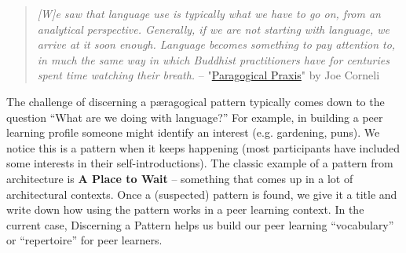 \begin{quote}
\emph{{[}W{]}e saw that language use is typically what we have to go on,
from an analytical perspective. Generally, if we are not starting with
language, we arrive at it soon enough. Language becomes something to pay
attention to, in much the same way in which Buddhist practitioners have
for centuries spent time watching their breath.} --
"\href{http://paragogy.net/ParagogicalPraxisPaper}{Paragogical Praxis}"
by Joe Corneli
\end{quote}

The challenge of discerning a pæragogical pattern typically comes down
to the question ``What are we doing with language?'' For example, in
building a peer learning profile someone might identify an interest
(e.g. gardening, puns). We notice this is a pattern when it keeps
happening (most participants have included some interests in their
self-introductions). The classic example of a pattern from architecture
is \textbf{A Place to Wait} -- something that comes up in a lot of
architectural contexts. Once a (suspected) pattern is found, we give it
a title and write down how using the pattern works in a peer learning
context. In the current case, Discerning a Pattern helps us build our
peer learning ``vocabulary'' or ``repertoire'' for peer learners.
